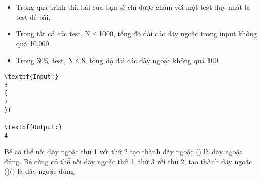 \begin{itemize}
	\item     Trong quá trình thi, bài của bạn sẽ chỉ được chấm với một test duy nhất là test đề bài.   
\end{itemize}
\begin{itemize}
	\item     Trong tất cả các test, N ≤ 1000, tổng độ dài các dãy ngoặc trong input không quá 10,000   
	\item     Trong 30\% test, N ≤ 8, tổng độ dài các dãy ngoặc không quá 100.   
\end{itemize}
\begin{verbatim}
\textbf{Input:}
3
(
)
)(

\textbf{Output:}
4
\end{verbatim}
Bé có thể nối dãy ngoặc thứ 1 với thứ 2 tạo thành dãy ngoặc () là dãy ngoặc đúng. Bé cũng có thể nối dãy ngoặc thứ 1, thứ 3 rồi thứ 2, tạo thành dãy ngoặc ()() là dãy ngoặc đúng.